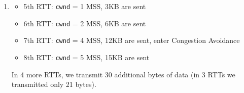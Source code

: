 \documentclass{report}
\begin{document}
\begin{problem}
\begin{answer}{35em}
\begin{enumerate}
    \item
      \begin{itemize}
        \item 5th RTT: \texttt{cwnd} = 1 MSS, 3KB are sent
        \item 6th RTT: \texttt{cwnd} = 2 MSS, 6KB are sent
        \item 7th RTT: \texttt{cwnd} = 4 MSS, 12KB are sent, enter Congestion Avoidance
        \item 8th RTT: \texttt{cwnd} = 5 MSS, 15KB are sent
      \end{itemize}
      In 4 more RTTs, we transmit 30 additional bytes of data (in 3 RTTs we
      transmitted only 21 bytes).
  \end{enumerate}
\end{answer}

\end{problem}
\end{document}
